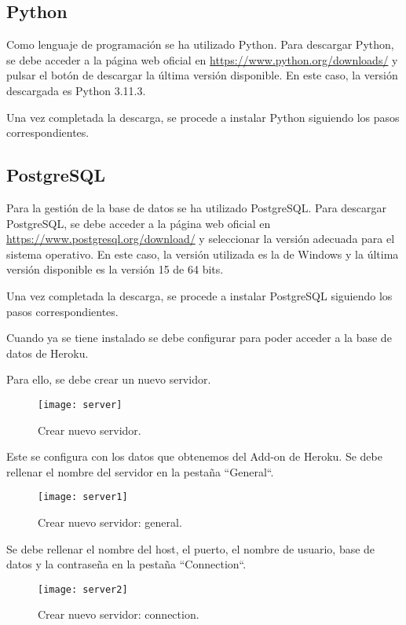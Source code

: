 \subsection{Python}
Como lenguaje de programación se ha utilizado Python. Para descargar Python, se debe acceder a la página web oficial en \url{https://www.python.org/downloads/} y pulsar el botón de descargar la última versión disponible. En este caso, la versión descargada es Python 3.11.3.

Una vez completada la descarga, se procede a instalar Python siguiendo los pasos correspondientes.

\subsection{PostgreSQL}
Para la gestión de la base de datos se ha utilizado PostgreSQL. Para descargar PostgreSQL, se debe acceder a la página web oficial en \url{https://www.postgresql.org/download/} y seleccionar la versión adecuada para el sistema operativo. En este caso, la versión utilizada es la de Windows y la última versión disponible es la versión 15 de 64 bits.

Una vez completada la descarga, se procede a instalar PostgreSQL siguiendo los pasos correspondientes.

Cuando ya se tiene instalado se debe configurar para poder acceder a la base de datos de Heroku. 

Para ello, se debe crear un nuevo servidor.
\newpage
    \begin{figure}[htbp]
    \centering
    \texttt{[image: server]}
    \caption{Crear nuevo servidor.}
    \label{fig:server}
    \end{figure}

Este se configura con los datos que obtenemos del Add-on de Heroku. Se debe rellenar el nombre del servidor en la pestaña ``General``.
    \begin{figure}[htbp]
    \centering
    \texttt{[image: server1]}
    \caption{Crear nuevo servidor: general.}
    \label{fig:server1}
    \end{figure}
    
Se debe rellenar el nombre del host, el puerto, el nombre de usuario, base de datos y la contraseña en la pestaña ``Connection``.
\newpage
    \begin{figure}[htbp]
    \centering
    \texttt{[image: server2]}
    \caption{Crear nuevo servidor: connection.}
    \label{fig:server2}
    \end{figure}
    

